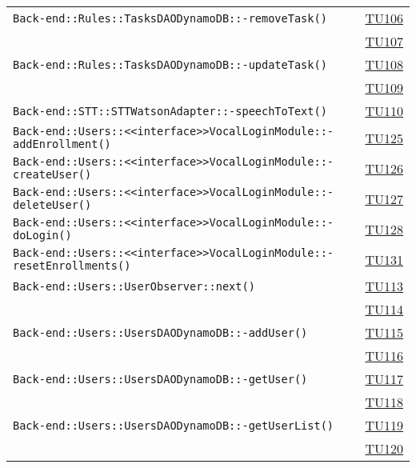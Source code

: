 \begin{longtable}{|>{\centering}m{12cm}|m{1cm}<{\centering}|}
\texttt{Back-end::Rules::TasksDAODynamoDB::-\linebreak removeTask()} & \hyperlink{TU106}{TU106}\\ & \hyperlink{TU107}{TU107}\\ \hline
\texttt{Back-end::Rules::TasksDAODynamoDB::-\linebreak updateTask()} & \hyperlink{TU108}{TU108}\\ & \hyperlink{TU109}{TU109}\\ \hline
\texttt{Back-end::STT::STTWatsonAdapter::-\linebreak speechToText()} & \hyperlink{TU110}{TU110}\\ \hline
\texttt{Back-end::Users::<<interface>>VocalLoginModule::-\linebreak addEnrollment()} & \hyperlink{TU125}{TU125}\\ \hline
\texttt{Back-end::Users::<<interface>>VocalLoginModule::-\linebreak createUser()} & \hyperlink{TU126}{TU126}\\ \hline
\texttt{Back-end::Users::<<interface>>VocalLoginModule::-\linebreak deleteUser()} & \hyperlink{TU127}{TU127}\\ \hline
\texttt{Back-end::Users::<<interface>>VocalLoginModule::-\linebreak doLogin()} & \hyperlink{TU128}{TU128}\\ \hline
\texttt{Back-end::Users::<<interface>>VocalLoginModule::-\linebreak resetEnrollments()} & \hyperlink{TU131}{TU131}\\ \hline
\texttt{Back-end::Users::UserObserver::next()} & \hyperlink{TU113}{TU113}\\ & \hyperlink{TU114}{TU114}\\ \hline
\texttt{Back-end::Users::UsersDAODynamoDB::-\linebreak addUser()} & \hyperlink{TU115}{TU115}\\ & \hyperlink{TU116}{TU116}\\ \hline
\texttt{Back-end::Users::UsersDAODynamoDB::-\linebreak getUser()} & \hyperlink{TU117}{TU117}\\ & \hyperlink{TU118}{TU118}\\ \hline
\texttt{Back-end::Users::UsersDAODynamoDB::-\linebreak getUserList()} & \hyperlink{TU119}{TU119}\\ & \hyperlink{TU120}{TU120}\\ \hline

\end{longtable}
